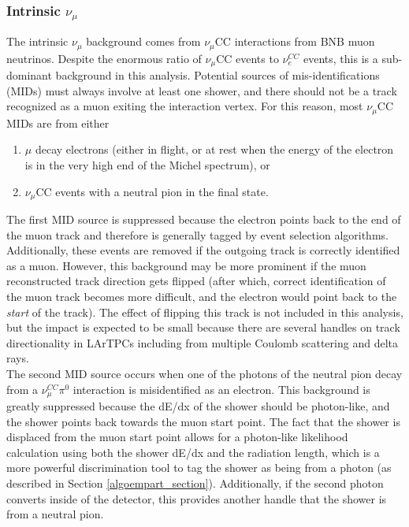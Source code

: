\subsubsection{Intrinsic $\nu_\mu$}
The intrinsic $\nu_\mu$ background comes from $\nu_\mu$CC interactions from BNB muon neutrinos. Despite the enormous ratio of $\nu_\mu$CC events to $\nu_e^{CC}$ events, this is a sub-dominant background in this analysis. Potential sources of mis-identifications (MIDs) must always involve at least one shower, and there should not be a track recognized as a muon exiting the interaction vertex. For this reason, most $\nu_\mu$CC MIDs are from either
\begin{enumerate}
\item $\mu$ decay electrons (either in flight, or at rest when the energy of the electron is in the very high end of the Michel spectrum), or 
\item $\nu_\mu$CC events with a neutral pion in the final state. 
\end{enumerate}
The first MID source is suppressed because the electron points back to the end of the muon track and therefore is generally tagged by event selection algorithms. Additionally, these events are removed if the outgoing track is correctly identified as a muon. However, this background may be more prominent if the muon reconstructed track direction gets flipped (after which, correct identification of the muon track becomes more difficult, and the electron would point back to the \textit{start} of the track). The effect of flipping this track is not included in this analysis, but the impact is expected to be small because there are several handles on track directionality in LArTPCs including from multiple Coulomb scattering and delta rays.\\

The second MID source occurs when one of the photons of the neutral pion decay from a $\nu_\mu^{CC}\pi^0$ interaction is misidentified as an electron. This background is greatly suppressed because the dE/dx of the shower should be photon-like, and the shower points back towards the muon start point. The fact that the shower is displaced from the muon start point allows for a photon-like likelihood calculation using both the shower dE/dx and the radiation length, which is a more powerful discrimination tool to tag the shower as being from a photon (as described in Section \ref{algoempart_section}). Additionally, if the second photon converts inside of the detector, this provides another handle that the shower is from a neutral pion.

